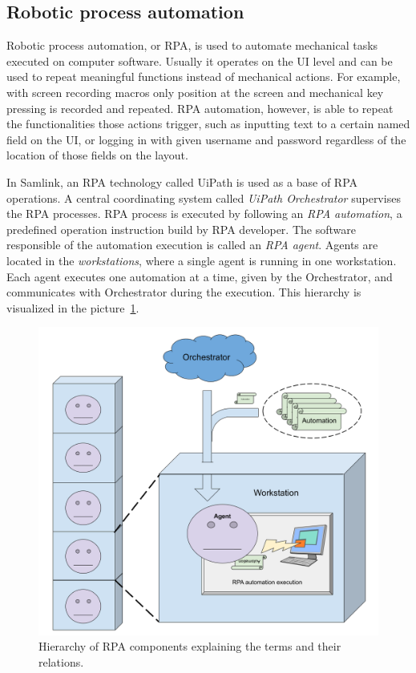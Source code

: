 \subsection{Robotic process automation}\label{subsec:bg-rpa}

Robotic process automation, or RPA,
is used to automate mechanical tasks executed on computer software.
Usually it operates on the UI level
and can be used to repeat meaningful functions
instead of mechanical actions.
For example, with screen recording macros
only position at the screen and mechanical key pressing is recorded and repeated.
RPA automation, however,
is able to repeat the functionalities those actions trigger,
such as inputting text to a certain named field on the UI,
or logging in with given username and password
regardless of the location of those fields on the layout.~\cite{tripathi2018learning}

In Samlink,
an RPA technology called UiPath is used as a base of RPA operations.
A central coordinating system called \textit{UiPath Orchestrator}
supervises the RPA processes.
RPA process is executed by following
an \textit{RPA automation},
a predefined operation instruction build by RPA developer.
The software responsible of the automation execution
is called an \textit{RPA agent}.
Agents are located in the \textit{workstations},
where a single agent is running in one workstation.
Each agent executes one automation at a time,
given by the Orchestrator,
and communicates with Orchestrator during the execution.
This hierarchy is visualized in the picture~\ref{fig:rpa-hierarchy}.

\begin{figure}[htb]
    \centering
    \includegraphics[width=\textwidth,]{./appendices/RPA-hierarchy}
    \caption{Hierarchy of RPA components explaining the terms and their relations.
    \label{fig:rpa-hierarchy}}
\end{figure}


